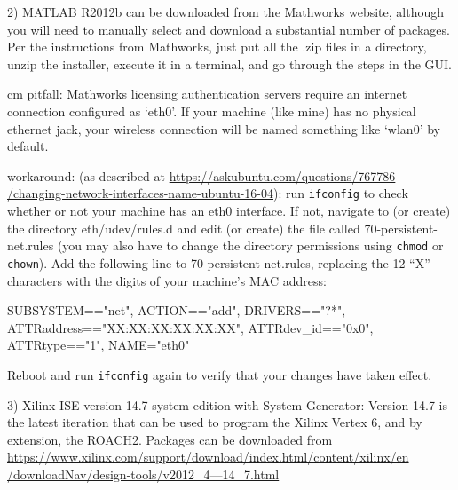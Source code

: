 \documentclass[a4paper,10pt]{article}
\begin{document}
\setlength{\parindent}{0.5cm}
\hangindent=1.0cm 2) MATLAB R2012b can be downloaded from the Mathworks website, although you will need to manually select and download a substantial number of packages. Per the instructions from Mathworks, just put all the .zip files in a directory, unzip the installer, execute it in a terminal, and go through the steps in the GUI.
\vspace{3mm} 

\setlength{\parindent}{1cm} cm pitfall: Mathworks licensing authentication servers require an internet connection configured as `eth0'. If your machine (like mine) has no physical ethernet jack, your wireless connection will be named something like `wlan0' by default.
\vspace{3mm}

\hangindent=1.0cm workaround: (as described at \href{https://askubuntu.com/questions/767786/changing-network-interfaces-name-ubuntu-16-04}{https://askubuntu.com/questions/767786 /changing-network-interfaces-name-ubuntu-16-04}):  run \texttt{ifconfig} to check whether or not your machine has an eth0 interface. If not, navigate to (or create) the directory eth/udev/rules.d and edit (or create) the file called 70-persistent-net.rules (you may also have to change the directory permissions using \texttt{chmod} or \texttt{chown}). Add the following line to 70-persistent-net.rules, replacing the 12 “X” characters with the digits of your machine’s MAC address:
\vspace{3mm} 

\hangindent=1.0cm SUBSYSTEM=="net", ACTION=="add", DRIVERS=="?*", ATTR{address}=="XX:XX:XX:XX:XX:XX", ATTR{dev\_id}=="0x0", ATTR{type}=="1", NAME="eth0"
\vspace{3mm} 

\hangindent=1.0cm Reboot and run \texttt{ifconfig} again to verify that your changes have taken effect.
\vspace{3mm} 

\setlength{\parindent}{0.5cm}
\hangindent=1.0cm 3) Xilinx ISE version 14.7 system edition with System Generator: Version 14.7 is the latest iteration that can be used to program the Xilinx Vertex 6, and by extension, the ROACH2. Packages can be downloaded from
\href{https://www.xilinx.com/support/download/index.html/content/xilinx/en/downloadNav/design-tools/v2012\_4---14\_7.html}{https://www.xilinx.com/support/download/index.html/content/xilinx/en /downloadNav/design-tools/v2012\_4---14\_7.html}
\vspace{3mm} 
\end{document}
